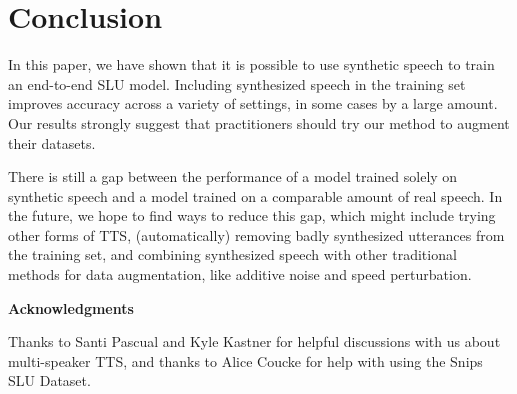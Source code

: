 \documentclass{article}
\begin{document}
\section{Conclusion}
\label{sec:refs}

In this paper, we have shown that it is possible to use synthetic speech to train an end-to-end SLU model. Including synthesized speech in the training set improves accuracy across a variety of settings, in some cases by a large amount. Our results strongly suggest that practitioners should try our method to augment their datasets.

There is still a gap between the performance of a model trained solely on synthetic speech and a model trained on a comparable amount of real speech. In the future, we hope to find ways to reduce this gap, which might include trying other forms of TTS, (automatically) removing badly synthesized utterances from the training set, and combining synthesized speech with other traditional methods for data augmentation, like additive noise and speed perturbation.



\vspace{0.5cm}
\noindent\textbf{Acknowledgments}

Thanks to \mbox{Santi} \mbox{Pascual} and \mbox{Kyle} \mbox{Kastner} for helpful discussions with us about multi-speaker TTS, and thanks to \mbox{Alice} \mbox{Coucke} for help with using the Snips SLU Dataset.






\end{document}

